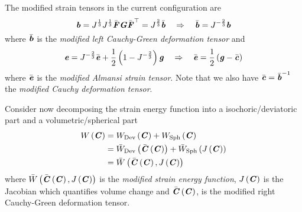 The modified strain tensors in the current configuration are 
\begin{equation}
  \boldsymbol{\mathit{b}} = J^{\frac{1}{3}}J^{\frac{1}{3}}\bar{\boldsymbol{\mathit{F}}}\boldsymbol{\mathit{G}} {\bar{\boldsymbol{\mathit{F}}}}^{ \top } =J^{\frac{2}{3}}\bar{\boldsymbol{\mathit{b}}} \quad\Rightarrow\quad \bar{\boldsymbol{\mathit{b}}} =J^{-\frac{2}{3}}\boldsymbol{\mathit{b}}
\end{equation}
where $\bar{\boldsymbol{\mathit{b}}}$ is the \emph{modified left Cauchy-Green deformation
  tensor} and
\begin{equation}
  \boldsymbol{\mathit{e}} =
  J^{-\frac{2}{3}}{\bar{\boldsymbol{\mathit{e}}}}+\dfrac{1}{2}\left( 1-J^{-\frac{2}{3}} \right)\boldsymbol{\mathit{g}}
  \quad\Rightarrow\quad \bar{\boldsymbol{\mathit{e}}} = \dfrac{1}{2}\left( \boldsymbol{\mathit{g}}-\bar{\boldsymbol{\mathit{c}}} \right)
\end{equation}
where $\bar{\boldsymbol{\mathit{e}}}$ is the \emph{modified Almansi strain
  tensor}. Note that we also have
$\bar{\boldsymbol{\mathit{c}}}= {\bar{\boldsymbol{\mathit{b}}}}^{-1} $ the \emph{modified Cauchy
  deformation tensor}.

Consider now decomposing the strain energy function into a
isochoric/deviatoric part and a volumetric/spherical part \ie
\begin{equation}
  \begin{split}
    \fnof{W}{\tensor{C}} &=
    \fnof{W_{\Devop}}{\tensor{C}}+\fnof{W_{\Sphop}}{\tensor{C}} \\
    &=\fnof{\bar{W}_{\Devop}}{\fnof{\bar{\tensor{C}}}{\tensor{C}}}+\fnof{\bar{W}_{\Sphop}}{\fnof{J}{\tensor{C}}}\\
    &=\fnof{\bar{W}}{\fnof{\bar{\tensor{C}}}{\tensor{C}},\fnof{J}{\tensor{C}}}
  \end{split}
  \label{eqn:FiniteElasticityDecomposedStrainEnergy}
\end{equation}
where
$ \bar{W}\left(  \bar{\boldsymbol{\mathit{C}}}\left( \boldsymbol{\mathit{C}} \right) , J\left( \boldsymbol{\mathit{C}} \right)  \right) $
is the \emph{modified strain energy function}, $ J\left( \boldsymbol{\mathit{C}} \right) $ is the
Jacobian which quantifies volume change and
$ \bar{\boldsymbol{\mathit{C}}}\left( \boldsymbol{\mathit{C}} \right) $, is the modified right Cauchy-Green
deformation tensor.

